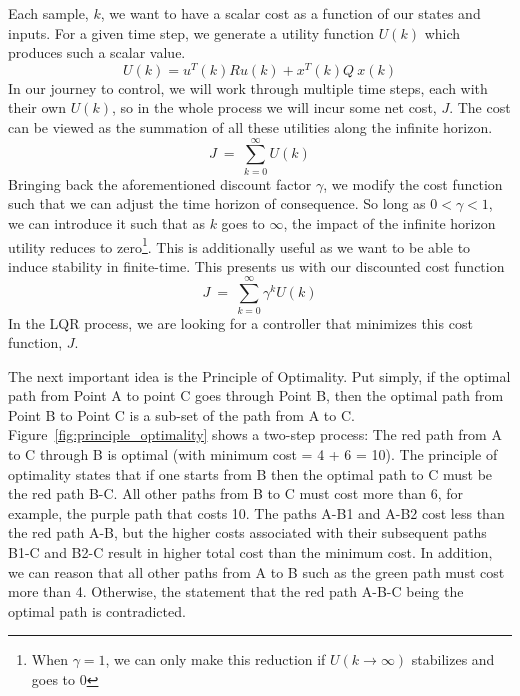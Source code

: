 Each sample, $k$, we want to have a scalar cost as a function of our states and inputs. For a given time step, we generate a utility function $U\left(k\right)$ which produces such a scalar value.
\begin{equation}
    U\left(k\right)=u^T\left(k\right)Ru\left(k\right)+x^T\left(k\right)Q\ x\left(k\right)
    \label{eq:utility_function}
\end{equation}
In our journey to control, we will work through multiple time steps, each with their own $U\left(k\right)$, so in the whole process we will incur some net cost, $J$. The cost can be viewed as the summation of all these utilities along the infinite horizon.
\begin{equation}
    J\ =\ \sum_{k=0}^{\infty}U\left(k\right)
    \label{eq:cost_function}
\end{equation}
Bringing back the aforementioned discount factor $\gamma$, we modify the cost function such that we can adjust the time horizon of consequence. So long as $0<\gamma < 1$, we can introduce it such that as $k$ goes to $\infty$, the impact of the infinite horizon utility reduces to zero\footnote{When $\gamma = 1$, we can only make this reduction if $U(k \to \infty)$ stabilizes and goes to $0$}. This is additionally useful as we want to be able to induce stability in finite-time. This presents us with our discounted cost function
\begin{equation}
    J\ =\ \sum_{k=0}^{\infty}{\gamma ^k U\left(k\right)}
    \label{eq:discounted_cost_function}
\end{equation}
In the LQR process, we are looking for a controller that minimizes this cost function, $J$.

The next important idea is the Principle of Optimality. Put simply, if the optimal path from Point A to point C goes through Point B, then the optimal path from Point B to Point C is a sub-set of the path from A to C. Figure~\ref{fig:principle_optimality} shows a two-step process: The red path from A to C through B is optimal (with minimum cost = 4 + 6 = 10). The principle of optimality states that if one starts from B then the optimal path to C must be the red path B-C. All other paths from B to C must cost more than 6, for example, the purple path that costs 10. The paths A-B1 and A-B2 cost less than the red path A-B, but the higher costs associated with their subsequent paths B1-C and B2-C result in higher total cost than the minimum cost. In addition, we can reason that all other paths from A to B such as the green path must cost more than 4. Otherwise, the statement that the red path A-B-C being the optimal path is contradicted. 


